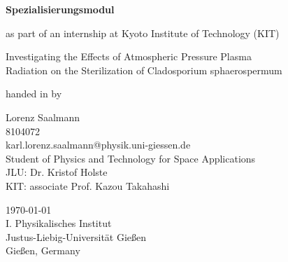 {%
\pagestyle{empty}
\sffamily

\vspace{1cm}
\vfill
{\bfseries \Large Spezialisierungsmodul}

{\Large as part of an internship at Kyoto Institute of Technology (KIT)}

\vspace{1cm}

{\Large Investigating the Effects of 
Atmospheric Pressure Plasma\\ Radiation 
on the Sterilization of Cladosporium sphaerospermum}
\vfill

handed in by

{\Large Lorenz Saalmann}\\[1.0ex]
{\large {8104072}}\\[.2ex]
{karl.lorenz.saalmann@physik.uni-giessen.de}\\[2ex]
{\large {Student of Physics and Technology for Space Applications}}\\[.5ex]


{\large {JLU:    Dr. Kristof Holste}}\\[.5ex]
{\large {KIT:    associate Prof. Kazou Takahashi}}\\[.5ex]


\vfill



{\large {\today}}\\[.5ex]

{\large {I. Physikalisches Institut}}\\[.5ex]
{\large {Justus-Liebig-Universität Gießen}}\\[.5ex]
{\large {Gießen, Germany}}\\[.5ex]

\cleardoublepage
}%